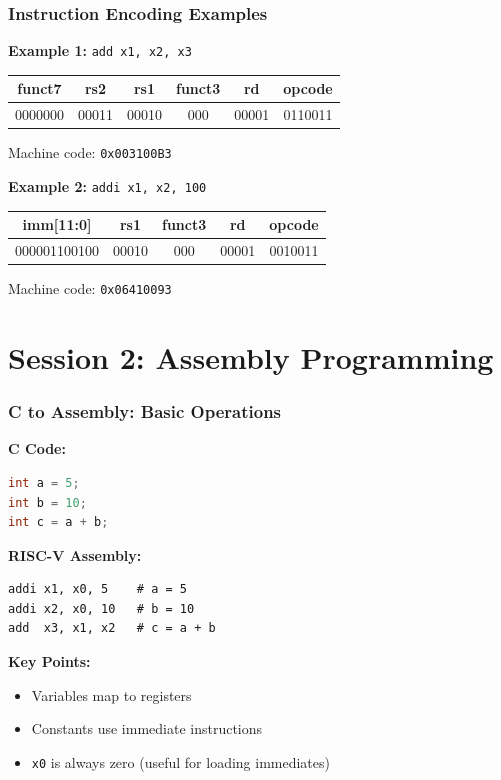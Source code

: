\documentclass[aspectratio=169,xcolor=dvipsnames]{beamer}
\begin{document}
\begin{frame}
\frametitle{Instruction Encoding Examples}
\textbf{Example 1:} \texttt{add x1, x2, x3}
\begin{center}
\begin{tabular}{|c|c|c|c|c|c|}
\hline
funct7 & rs2 & rs1 & funct3 & rd & opcode \\
\hline
0000000 & 00011 & 00010 & 000 & 00001 & 0110011 \\
\hline
\end{tabular}
\end{center}
Machine code: \texttt{0x003100B3}

\vspace{1em}
\textbf{Example 2:} \texttt{addi x1, x2, 100}
\begin{center}
\begin{tabular}{|c|c|c|c|c|}
\hline
imm[11:0] & rs1 & funct3 & rd & opcode \\
\hline
000001100100 & 00010 & 000 & 00001 & 0010011 \\
\hline
\end{tabular}
\end{center}
Machine code: \texttt{0x06410093}
\end{frame}

\section{Session 2: Assembly Programming}

\begin{frame}[fragile]
\frametitle{C to Assembly: Basic Operations}
\begin{multicols}{2}
\textbf{C Code:}
\begin{lstlisting}[language=C]
int a = 5;
int b = 10;
int c = a + b;
\end{lstlisting}

\columnbreak

\textbf{RISC-V Assembly:}

\begin{lstlisting}[language=RISC-V]
addi x1, x0, 5    # a = 5
addi x2, x0, 10   # b = 10
add  x3, x1, x2   # c = a + b
\end{lstlisting}

\end{multicols}

\textbf{Key Points:}
\begin{itemize}
    \item Variables map to registers
    \item Constants use immediate instructions
    \item \texttt{x0} is always zero (useful for loading immediates)
\end{itemize}
\end{frame}
\end{document}
